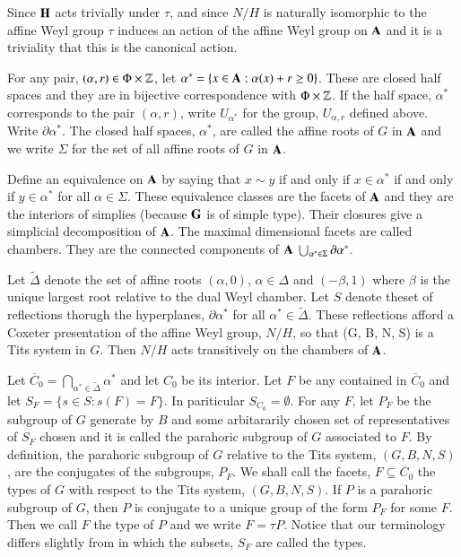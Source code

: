 Since $\mathbf{H}$ acts trivially under $\tau$, and since $N/H$ is naturally isomorphic to the affine Weyl group $\tau$ induces an action of the affine Weyl group on $\mathbf{A}$ and it is a triviality that this is the canonical action. 

For any pair, $(\alpha, r) \in \Phi \times \mathbb{Z}$, let $\alpha^{*} = \{x \in \mathbf{A} : \alpha(x) + r \geq 0\}$. These are closed half spaces and they are in bijective correspondence with $\Phi \times \mathbb{Z}$. If the half space, $\alpha^{*}$ corresponds to the pair $(\alpha, r)$, write $U_{\alpha^{*}}$ for the group, $U_{\alpha, r}$ defined above. Write $\partial\alpha^{*}$. The closed half spaces, $\alpha^{*}$, are called the affine roots of $G$ in $\mathbf{A}$ and we write $\Sigma$ for the set of all affine roots of $G$ in $\mathbf{A}$.

Define an equivalence on $\mathbf{A}$ by saying that $x\sim y$ if and only if $x \in \alpha^{*}$ if and only if $y \in \alpha^{*}$ for all $\alpha \in \Sigma$. These equivalence classes are the facets of $\mathbf{A}$ and they are the interiors of simplies (because $\mathbf{G}$ is of simple type). Their closures give a simplicial decomposition of $\mathbf{A}$. The maximal dimensional facets are called chambers. They are the connected components of $\mathbf{A}\ \bigcup_{\alpha^{*} \in \Sigma}\partial \alpha^{*}$.

Let $\tilde{\Delta}$ denote the set of affine roots $(\alpha, 0)$, $\alpha \in \Delta$ and $(-\beta, 1)$ where $\beta$ is the unique largest root relative to the dual Weyl chamber. Let $S$ denote the\pageoriginale set of reflections thorugh the hyperplanes, $\partial\alpha^{*}$ for all $\alpha^{*} \in \tilde{\Delta}$. These reflections afford a Coxeter presentation of the affine Weyl group, $N/H$, so that (G, B, N, S) is a Tits system in $G$. Then $N/H$ acts transitively on the chambers of $\mathbf{A}$.

Let $\overline{C}_{0} = \bigcap_{\alpha^{*} \in \tilde{\Delta}} \alpha^{*}$ and let $C_{0}$ be its interior. Let $F$ be any contained in $\overline{C}_{0}$ and let $S_{F} = \{ s \in S : s(F) = F \}$. In pariticular $S_{C_{0}} = \emptyset$. For any $F$, let $P_{F}$ be the subgroup of $G$ generate by $B$ and some arbitararily chosen set of representatives of $S_{F}$ chosen and it is called the parahoric subgroup of $G$ associated to $F$. By definition, the parahoric subgroup of $G$ relative to the Tits system, $(G, B, N, S)$, are the conjugates of the subgroups, $P_{F}$. We shall call the facets, $F \subseteq \overline{C}_{0}$ the types of $G$ with respect to the Tits system, $(G, B, N, S)$. If $P$ is a parahoric subgroup of $G$, then $P$ is conjugate to a unique group of the form $P_{F}$ for some $F$. Then we call $F$ the type of $P$ and we write $F= \tau{P}$. Notice that our terminology differs slightly from \cite{chap6-keyBT-I} in which the subsets, $S_{F}$ are called the types. 

